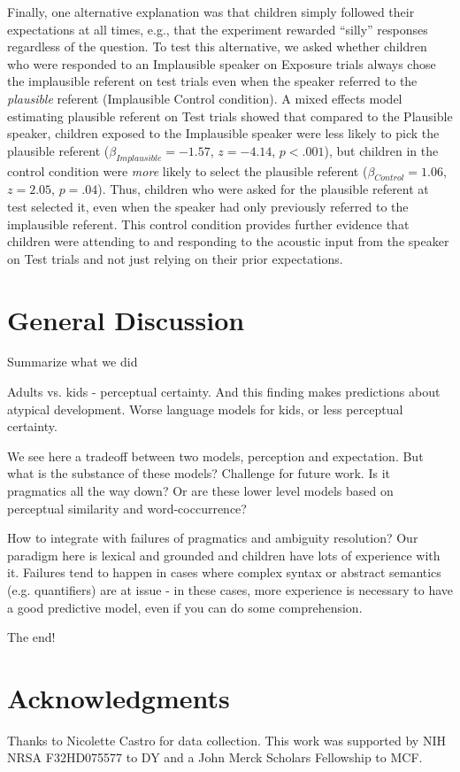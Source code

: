 \documentclass[man,floatsintext]{apa6}
\begin{document}
Finally, one alternative explanation was that children simply followed their expectations at all times, e.g., that the experiment rewarded ``silly'' responses regardless of the question. To test this alternative, we asked whether children who were responded to an Implausible speaker on Exposure trials always chose the implausible referent on test trials even when the speaker referred to the \emph{plausible} referent (Implausible Control condition). A mixed effects model estimating plausible referent on Test trials showed that compared to the Plausible speaker, children exposed to the Implausible speaker were less likely to pick the plausible referent ($\beta_{Implausible} = -1.57$,  $z = -4.14$, $p <.001$), but children in the control condition were \emph{more} likely to select the plausible referent ($\beta_{Control} = 1.06$,  $z = 2.05$, $p = .04$). Thus, children who were asked for the plausible referent at test selected it, even when the speaker had only previously referred to the implausible referent. This control condition provides further evidence that children were attending to and responding to the acoustic input from the speaker on Test trials and not just relying on their prior expectations.


\section{General Discussion}

Summarize what we did

Adults vs. kids - perceptual certainty. And this finding makes predictions about atypical development. Worse language models for kids, or less perceptual certainty. 

We see here a tradeoff between two models, perception and expectation. But what is the substance of these models? Challenge for future work. Is it pragmatics all the way down? Or are these lower level models based on perceptual similarity and word-coccurrence?

How to integrate with failures of pragmatics and ambiguity resolution? Our paradigm here is lexical and grounded and children have lots of experience with it. Failures tend to happen in cases where complex syntax or abstract semantics (e.g. quantifiers) are at issue - in these cases, more experience is necessary to have a good predictive model, even if you can do some comprehension. 

The end!

\section{Acknowledgments}

Thanks to Nicolette Castro for data collection. This work was supported by NIH NRSA F32HD075577 to DY and a John Merck Scholars Fellowship to MCF.



\end{document}
